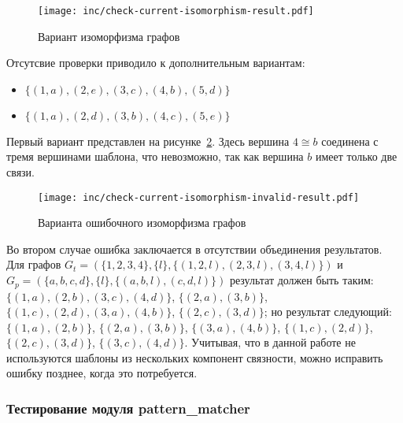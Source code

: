 \begin{figure}[!ht]
\centering
\texttt{[image: inc/check-current-isomorphism-result.pdf]}
\caption{Вариант изоморфизма графов}
\label{fig:check-current-isomorphism-result}
\end{figure}

Отсутсвие проверки приводило к дополнительным вариантам:
\begin{itemize}
\item $\{ (1, a), (2, e), (3, c), (4, b), (5, d) \}$
\item $\{ (1, a), (2, d), (3, b), (4, c), (5, e) \}$
\end{itemize}
Первый вариант представлен на
рисунке~\ref{fig:check-current-isomorphism-invalid-result}.
Здесь вершина $4 \cong b$ соединена с тремя вершинами шаблона,
что невозможно, так как вершина $b$ имеет только две связи.

\begin{figure}[!ht]
\centering
\texttt{[image: inc/check-current-isomorphism-invalid-result.pdf]}
\caption{Варианта ошибочного изоморфизма графов}
\label{fig:check-current-isomorphism-invalid-result}
\end{figure}

Во втором случае ошибка заключается в отсутствии объединения результатов.
Для графов $G_t = (\{ 1, 2, 3, 4 \}, \{ l \}, \{ (1, 2, l), (2, 3, l), (3, 4, l) \})$
и $G_p = (\{ a, b, c, d \}, \{ l \}, \{ (a, b, l), (c, d, l) \})$
результат должен быть таким:
$\{ (1, a), (2, b), (3, c), (4, d) \}$,
$\{ (2, a), (3, b) \}$,
$\{ (1, c), (2, d), (3, a), (4, b) \}$,
$\{ (2, c), (3, d) \}$;
но результат следующий:
$\{ (1, a), (2, b) \}$,
$\{ (2, a), (3, b) \}$,
$\{ (3, a), (4, b) \}$,
$\{ (1, c), (2, d) \}$,
$\{ (2, c), (3, d) \}$,
$\{ (3, c), (4, d) \}$.
Учитывая, что в данной работе не используются шаблоны из нескольких компонент
связности, можно исправить ошибку позднее, когда это потребуется.

\subsubsection{Тестирование модуля pattern\_matcher}

